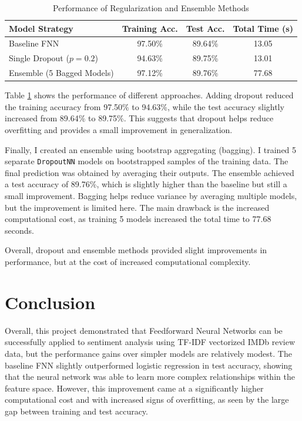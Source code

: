 \documentclass{article}
\begin{document}
\begin{table}[h]
\centering
\caption{Performance of Regularization and Ensemble Methods}
\label{tab:ensemble-performance}
\begin{tabular}{@{}lccc@{}}
\toprule
\textbf{Model Strategy} & \textbf{Training Acc.} & \textbf{Test Acc.} & \textbf{Total Time (s)} \\ \midrule
Baseline FNN & 97.50\% & 89.64\%  & 13.05  \\
Single Dropout ($p=0.2$) & 94.63\%  & 89.75\%  & 13.01  \\
Ensemble (5 Bagged Models) & 97.12\%  & 89.76\%  & 77.68  \\ \bottomrule
\end{tabular}
\end{table}

Table \ref{tab:ensemble-performance} shows the performance of different approaches. Adding dropout reduced the training accuracy from 97.50\% to 94.63\%, while the test accuracy slightly increased from 89.64\% to 89.75\%. This suggests that dropout helps reduce overfitting and provides a small improvement in generalization.

Finally, I created an ensemble using bootstrap aggregating (bagging). I trained 5 separate \texttt{DropoutNN} models on bootstrapped samples of the training data. The final prediction was obtained by averaging their outputs. The ensemble achieved a test accuracy of 89.76\%, which is slightly higher than the baseline but still a small improvement. Bagging helps reduce variance by averaging multiple models, but the improvement is limited here. The main drawback is the increased computational cost, as training 5 models increased the total time to 77.68 seconds.

Overall, dropout and ensemble methods provided slight improvements in performance, but at the cost of increased computational complexity.

\section{Conclusion}

Overall, this project demonstrated that Feedforward Neural Networks can be successfully applied to sentiment analysis using TF-IDF vectorized IMDb review data, but the performance gains over simpler models are relatively modest. The baseline FNN slightly outperformed logistic regression in test accuracy, showing that the neural network was able to learn more complex relationships within the feature space. However, this improvement came at a significantly higher computational cost and with increased signs of overfitting, as seen by the large gap between training and test accuracy.
\end{document}
